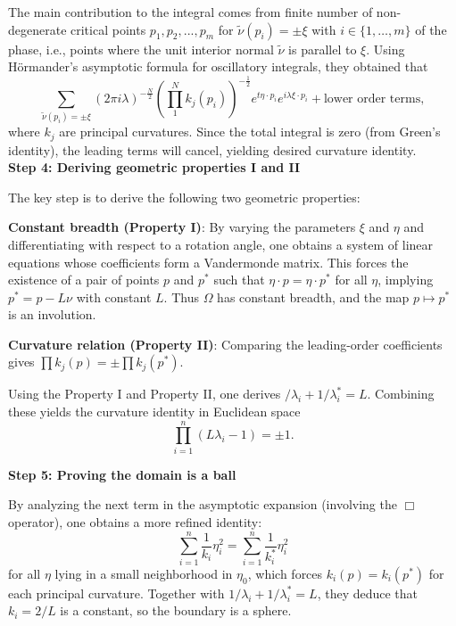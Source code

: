 \documentclass[12pt]{article}
\numberwithin{equation}{section}
\numberwithin{equation}{section}
\begin{document}
The main contribution to the integral comes from finite number of non-degenerate critical points $p_1, p_2, ...,p_m$ for $\widetilde{\nu}\left(p_{i}\right)=\pm\xi$ with $i\in\{1,\dots,m\}$ of the phase, i.e., points where the unit interior normal $\widetilde{\nu}$ is parallel to $\xi$. Using H\"{o}rmander's asymptotic formula \cite[Theorem 7.7.5]{Hormander} for oscillatory integrals, they obtained that
$$
\sum_{\widetilde{\nu}\left(p_{i}\right)=\pm \xi}\left(2\pi i\lambda\right)^{-\frac{N}{2}}\left(\prod_1^Nk_j(p_{i})\right)^{-\frac{1}{2}}e^{t\eta\cdot p_{i}}e^{i\lambda\xi\cdot p_{i}}+\text{lower order terms},
$$
where $k_j$ are principal curvatures. Since the total integral is zero (from Green's identity), the leading terms will cancel, yielding desired curvature identity.
~\\

\textbf{Step 4: Deriving geometric properties I and II}

The key step is to derive the following two geometric properties:

\textbf{Constant breadth (Property I)}: By varying the parameters $\xi$ and $\eta$ and differentiating with respect to a rotation angle, one obtains a system of linear equations whose coefficients form a Vandermonde matrix. This forces the existence of a pair of points $p$ and $p^*$ such that $\eta\cdot p=\eta\cdot p^*$ for all $\eta$, implying $p^*=p-L\nu$ with constant $L$. Thus $\Omega$ has constant breadth, and the map $p\mapsto p^*$ is an involution.

\textbf{Curvature relation (Property II)}:
Comparing the leading-order coefficients gives $\prod k_j(p)=\pm\prod k_j\left(p^*\right)$.

Using the Property I and Property II, one derives
$/\lambda_{i}+1/\lambda_{i}^*=L$. Combining these yields the curvature identity in Euclidean space
$$
\prod_{i=1}^n \left(L\lambda_{i}-1\right)=\pm 1.
$$

\textbf{Step 5: Proving the domain is a ball}

By analyzing the next term in the asymptotic expansion (involving the $\Box$ operator), one obtains a more refined identity:
$$
\sum_{i=1}^n\frac{1}{k_{i}}\eta_i^2=\sum_{i=1}^n\frac{1}{k_{i}^*}\eta_i^2
$$
for all $\eta$ lying in a small neighborhood in $\eta_0$, which forces $k_{i}(p)=k_{i}\left(p^*\right)$ for each principal curvature. Together with $1/\lambda_{i}+1/\lambda_{i}^*=L$, they deduce that $k_{i}=2/L$ is a constant, so the boundary is a sphere.
~\\
\end{document}

